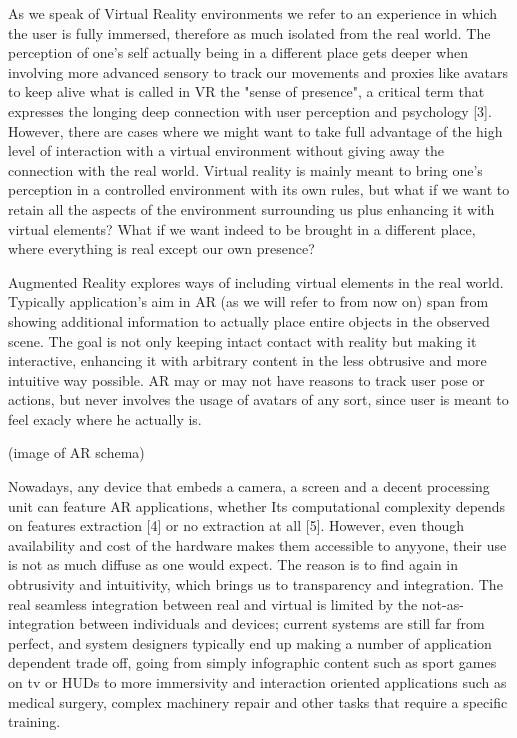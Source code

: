 As we speak of Virtual Reality environments we refer to an experience in which the user is fully immersed, therefore as much isolated from the real world. The perception of one’s self actually being in a different place gets deeper when involving more advanced sensory to track our movements and proxies like avatars to keep alive what is called in VR the "sense of presence", a critical term that expresses the longing deep connection with user perception and psychology [3]. However, there are cases where we might want to take full advantage of the high level of interaction with a virtual environment without giving away the connection with the real world. Virtual reality is mainly meant to bring one’s perception in a controlled environment with its own rules, but what if we want to retain all the aspects of the environment surrounding us plus enhancing it with virtual elements? What if we want indeed to be brought in a different place, where everything is real except our own presence?

Augmented Reality explores ways of including virtual elements in the real world. Typically application’s aim in AR (as we will refer to from now on) span from showing additional information to actually place entire objects in the observed scene. The goal is not only keeping intact contact with reality but making it interactive, enhancing it with arbitrary content in the less obtrusive and more intuitive way possible. AR may or may not have reasons to track user pose or actions, but never involves the usage of avatars of any sort, since user is meant to feel exacly where he actually is.

(image of AR schema)

Nowadays, any device that embeds a camera, a screen and a decent processing unit can feature AR applications, whether Its computational complexity depends on features extraction [4] or no extraction at all [5]. However, even though availability and cost of the hardware makes them accessible to anyyone, their use is not as much diffuse as one would expect. The reason is to find again in obtrusivity and intuitivity, which brings us to transparency and integration. The real seamless integration between real and virtual is limited by the not-as-integration between individuals and devices; current systems are still far from perfect, and system designers typically end up making a number of application dependent trade off, going from simply infographic content such as sport games on tv or HUDs to more immersivity and interaction oriented applications such as medical surgery, complex machinery repair and other tasks that require a specific training.

